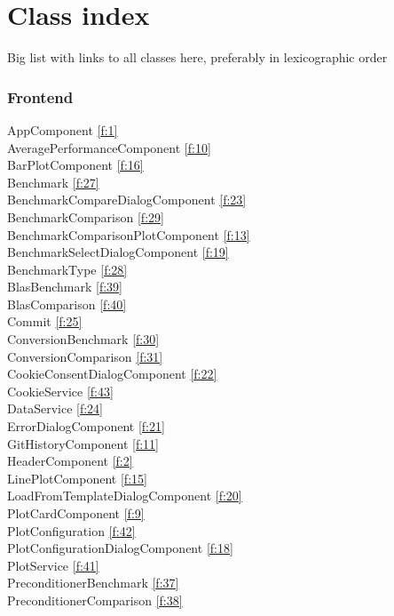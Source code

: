 \section{Class index}
Big list with links to all classes here, preferably in lexicographic order

\subsubsection{Frontend}

AppComponent \ref{f:1} \\
AveragePerformanceComponent \ref{f:10} \\
BarPlotComponent \ref{f:16} \\
Benchmark \ref{f:27} \\
BenchmarkCompareDialogComponent \ref{f:23} \\
BenchmarkComparison \ref{f:29} \\
BenchmarkComparisonPlotComponent \ref{f:13} \\
BenchmarkSelectDialogComponent \ref{f:19} \\
BenchmarkType \ref{f:28} \\
BlasBenchmark  \ref{f:39} \\
BlasComparison  \ref{f:40} \\
Commit \ref{f:25} \\
ConversionBenchmark  \ref{f:30} \\
ConversionComparison  \ref{f:31} \\
CookieConsentDialogComponent \ref{f:22} \\
CookieService \ref{f:43} \\
DataService \ref{f:24} \\
ErrorDialogComponent \ref{f:21} \\
GitHistoryComponent \ref{f:11} \\
HeaderComponent \ref{f:2} \\
LinePlotComponent \ref{f:15} \\
LoadFromTemplateDialogComponent \ref{f:20} \\
PlotCardComponent \ref{f:9} \\
PlotConfiguration \ref{f:42} \\
PlotConfigurationDialogComponent \ref{f:18} \\
PlotService \ref{f:41} \\
PreconditionerBenchmark  \ref{f:37} \\
PreconditionerComparison  \ref{f:38} \\
